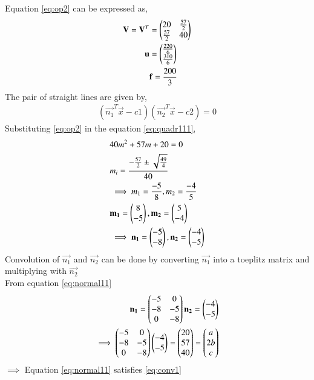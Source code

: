 \documentclass[journal,12pt,twocolumn]{IEEEtran}
\begin{document}
Equation \eqref{eq:op2} can be expressed as,
\begin{align}
\mathbf{V}=\mathbf{V}^T&=\begin{pmatrix}20 & \frac{57}{2} \\ \frac{57}{2} & 40\end{pmatrix} \label{eq:eq1vec1}\\
\mathbf{u}&=\begin{pmatrix}\frac{220}{6} \\ \frac{310}{6}\end{pmatrix} \label{eq:eq2vec1}\\
&\mathbf{f}=\frac{200}{3}
\end{align}
The pair of straight lines are given by,
\begin{align}
    (\vec{n_1}^{T}\vec{x} - c1)(\vec{n_2}^{T}\vec{x} - c2)=0\label{eq:maineq2}
\end{align}
Substituting \eqref{eq:op2} in the equation \eqref{eq:quadr111},
\begin{align}
    &40m^2+57m+20=0 \label{eq:quadr11}\\
    &m_i=\frac{-\frac{57}{2}\pm{\sqrt{\frac{49}{4}}}}{40}\\
    &\implies m_1 = \frac{-5}{8} , m_2 = \frac{-4}{5}\\
    & \mathbf{m_1}=\begin{pmatrix}8\\ -5\end{pmatrix}, \mathbf{m_2}=\begin{pmatrix}5\\ -4\end{pmatrix}\\
    &\implies \mathbf{n_1}=\begin{pmatrix}-5\\ -8\end{pmatrix}, \mathbf{n_2}=\begin{pmatrix}-4\\ -5\end{pmatrix} \label{eq:normal11}
\end{align}
Convolution of $\vec{n_1}$ and $\vec{n_2}$ can be done by converting $\vec{n_1}$ into a toeplitz matrix and multiplying with $\vec{n_2}$\\
From equation \eqref{eq:normal11}
\begin{align}
    \mathbf{n_1}=\begin{pmatrix}-5&0\\-8&-5\\0&-8\end{pmatrix}
    \mathbf{n_2}=\begin{pmatrix}-4\\ -5\end{pmatrix}\label{eq:conv21}\\
\implies \begin{pmatrix}-5&0\\-8&-5\\0&-8\end{pmatrix}\begin{pmatrix}-4\\ -5\end{pmatrix} = \begin{pmatrix}20\\57\\40\end{pmatrix} = \begin{pmatrix}a\\2b\\c\end{pmatrix}\label{eq:conv31}
\end{align}
$\implies$ Equation \eqref{eq:normal11} satisfies \eqref{eq:conv1}\\
\end{document}
